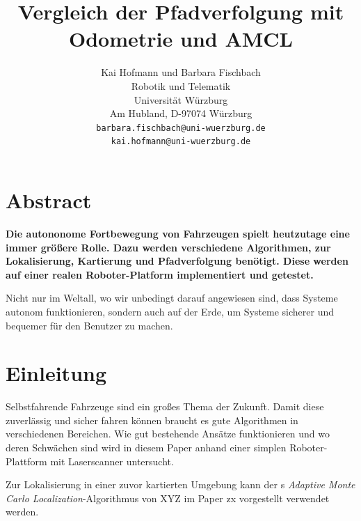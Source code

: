 \documentclass[11pt,a4paper]{article}
\begin{document}
\sloppy

\title{\Large\bf Vergleich der Pfadverfolgung mit Odometrie und AMCL }

\author{Kai Hofmann und Barbara Fischbach\\
  Robotik und Telematik \\
  Universit\"at W\"urzburg\\
  Am Hubland, D-97074 W\"urzburg\\
{\small \texttt{barbara.fischbach@uni-wuerzburg.de}}\\
{\small \texttt{kai.hofmann@uni-wuerzburg.de}}}

\date{}



\maketitle


\newpage

\twocolumn

\section*{Abstract}


\textbf{Die autononome Fortbewegung von Fahrzeugen spielt heutzutage eine immer gr\"o\ss{}ere Rolle. Dazu werden verschiedene Algorithmen, zur Lokalisierung, Kartierung und Pfadverfolgung ben\"otigt. Diese werden auf einer realen Roboter-Platform implementiert und getestet.}

Nicht nur im Weltall, wo wir unbedingt darauf angewiesen sind, dass Systeme autonom funktionieren, sondern auch auf der Erde, um Systeme sicherer und bequemer f\"ur den Benutzer zu machen. 


\section{Einleitung}
	Selbstfahrende Fahrzeuge sind ein gro{\ss}es Thema der Zukunft. Damit diese zuverlässig und sicher fahren können braucht es gute Algorithmen in verschiedenen Bereichen. Wie gut bestehende Ans\"atze funktionieren und wo deren Schw\"achen sind wird in diesem Paper anhand einer simplen Roboter-Plattform mit Laserscanner untersucht. 

	Zur Lokalisierung in einer zuvor kartierten Umgebung kann der s \textit{Adaptive Monte Carlo Localization}-Algorithmus von XYZ im Paper zx vorgestellt verwendet werden. 
	
\end{document}
